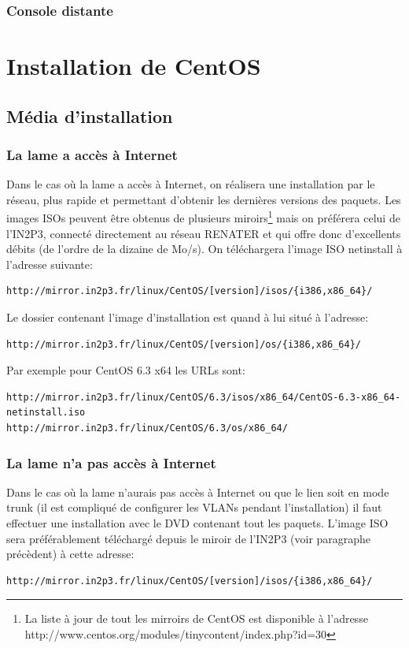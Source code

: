 \documentclass[a4paper,oneside]{report}
\begin{document}
\subsubsection{Console distante}

\section{Installation de CentOS} \label{sec:installcentos}
\subsection{Média d'installation} \label{sec:installmediacentos}
\subsubsection{La lame a accès à Internet}
Dans le cas où la lame a accès à Internet, on réalisera une installation par le réseau, plus rapide et permettant d'obtenir les dernières versions des paquets.
Les images ISOs peuvent être obtenus de plusieurs miroirs\footnote{La liste à jour de tout les mirroirs de CentOS est disponible à l'adresse http://www.centos.org/modules/tinycontent/index.php?id=30} mais on préférera celui de l'IN2P3, connecté directement au réseau RENATER et qui offre donc d'excellents débits (de l'ordre de la dizaine de Mo/s).\newline
On téléchargera l'image ISO netinstall à l'adresse suivante:
\begin{verbatim}
http://mirror.in2p3.fr/linux/CentOS/[version]/isos/{i386,x86_64}/
\end{verbatim}

\noindent Le dossier contenant l'image d'installation est quand à lui situé à l'adresse:
\begin{verbatim}
http://mirror.in2p3.fr/linux/CentOS/[version]/os/{i386,x86_64}/
\end{verbatim}

\noindent Par exemple pour CentOS 6.3 x64 les URLs sont:
\begin{verbatim}
http://mirror.in2p3.fr/linux/CentOS/6.3/isos/x86_64/CentOS-6.3-x86_64-netinstall.iso
http://mirror.in2p3.fr/linux/CentOS/6.3/os/x86_64/
\end{verbatim}

\subsubsection{La lame n'a pas accès à Internet}
Dans le cas où la lame n'aurais pas accès à Internet ou que le lien soit en mode trunk (il est compliqué de configurer les VLANs pendant l'installation) il faut effectuer une installation avec le DVD contenant tout les paquets.\newline
L'image ISO sera préférablement téléchargé depuis le miroir de l'IN2P3 (voir paragraphe précèdent) à cette adresse:
\begin{verbatim}
http://mirror.in2p3.fr/linux/CentOS/[version]/isos/{i386,x86_64}/
\end{verbatim}
\end{document}
